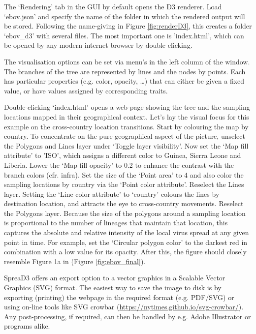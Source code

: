 \documentclass[english]{paper}
\def \spreadname {SpreaD3}
\begin{document}
The `Rendering' tab in the GUI by default opens the D3 renderer.
Load `ebov.json' and specify the name of the folder in which the rendered output will be stored. %
Following the name-giving in Figure \ref{fig:renderD3}, this creates a folder `ebov\_d3' with several files.
The most important one is 'index.html', which can be opened by any modern internet browser by double-clicking. 
\par
The visualisation options can be set via menu's in the left column of the window.
The branches of the tree are represented by lines and the nodes by points. %
Each has particular properties (e.g. color, opacity, \dots) that can either be given a fixed value, or have values assigned by corresponding traits.
\par
Double-clicking `index.html' opens a web-page showing the tree and the sampling locations mapped in their geographical context. 
Let's lay the visual focus for this example on the cross-country location transitions.
Start by colouring the map by country. 
To concentrate on the pure geographical aspect of the picture, unselect the Polygons and Lines layer under `Toggle layer visibility'.
Now set the `Map fill attribute' to 'ISO', which assigns a different color to Guinea, Sierra Leone and Liberia.
Lower the `Map fill opacity' to 0.2 to enhance the contrast with the branch colors (cfr. infra).
Set the size of the `Point area' to 4 and also color the sampling locations by country via the `Point color attribute'.
Reselect the Lines layer.
Setting the `Line color attribute' to `country' colours the lines by destination location, and attracts the eye to cross-country movements.
Reselect the Polygons layer.
Because the size of the polygons around a sampling location is proportional to the number of lineages that maintain that location, this captures the absolute and relative intensity of the local virus spread at any given point in time.
For example, set the `Circular polygon color'  to the darkest red in combination with a low value for its opacity. 
After this, the figure should closely resemble Figure 1a in \cite{Bielejec:2016aa} (Figure \ref{fig:ebov_final}).
\par
{\spreadname} offers an export option to a vector graphics in a Scalable Vector Graphics (SVG) format.
The easiest way to save the image to disk is by exporting (printing) the webpage in the required format (e.g. PDF/SVG) or using on-line tools like SVG crowbar (\url{https://nytimes.github.io/svg-crowbar/}).
Any post-processing, if required, can then be handled by e.g. Adobe Illustrator or programs alike.
\end{document}
